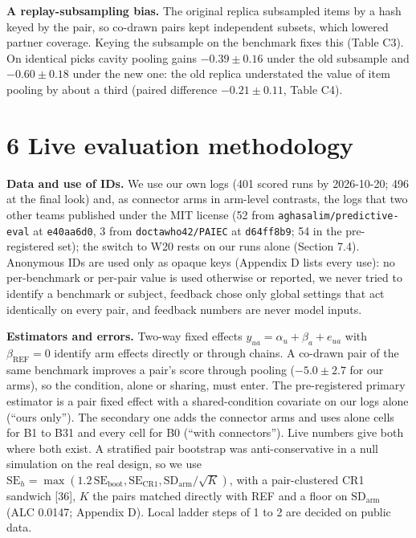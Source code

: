 \documentclass[
]{article}
\begin{document}
\textbf{A replay-subsampling bias.} The original replica subsampled
items by a hash keyed by the pair, so co-drawn pairs kept independent
subsets, which lowered partner coverage. Keying the subsample on the
benchmark fixes this (Table C3). On identical picks cavity pooling gains
\(-0.39 \pm 0.16\) under the old subsample and \(-0.60 \pm 0.18\) under
the new one: the old replica understated the value of item pooling by
about a third (paired difference \(-0.21 \pm 0.11\), Table C4).

\section{6 Live evaluation
methodology}\label{live-evaluation-methodology}

\textbf{Data and use of IDs.} We use our own logs (401 scored runs by
2026-10-20; 496 at the final look) and, as connector arms in arm-level
contrasts, the logs that two other teams published under the MIT license
(52 from \texttt{aghasalim/predictive-eval} at \texttt{e40aa6d0}, 3 from
\texttt{doctawho42/PAIEC} at \texttt{d64ff8b9}; 54 in the pre-registered
set); the switch to W20 rests on our runs alone (Section 7.4). Anonymous
IDs are used only as opaque keys (Appendix D lists every use): no
per-benchmark or per-pair value is used otherwise or reported, we never
tried to identify a benchmark or subject, feedback chose only global
settings that act identically on every pair, and feedback numbers are
never model inputs.

\textbf{Estimators and errors.} Two-way fixed effects
\(y_{ua} = \alpha_u + \beta_a + e_{ua}\) with
\(\beta_{\mathrm{REF}} = 0\) identify arm effects directly or through
chains. A co-drawn pair of the same benchmark improves a pair's score
through pooling (\(-5.0 \pm 2.7\) for our arms), so the condition, alone
or sharing, must enter. The pre-registered primary estimator is a pair
fixed effect with a shared-condition covariate on our logs alone (``ours
only''). The secondary one adds the connector arms and uses alone cells
for B1 to B31 and every cell for B0 (``with connectors''). Live numbers
give both where both exist. A stratified pair bootstrap was
anti-conservative in a null simulation on the real design, so we use
\(\mathrm{SE}_h = \max(1.2\,\mathrm{SE}_{\mathrm{boot}}, \mathrm{SE}_{\mathrm{CR1}},
\mathrm{SD}_{\mathrm{arm}}/\sqrt{K})\), with a pair-clustered CR1
sandwich {[}36{]}, \(K\) the pairs matched directly with REF and a floor
on \(\mathrm{SD}_{\mathrm{arm}}\) (ALC 0.0147; Appendix D). Local ladder
steps of 1 to 2 are decided on public data.
\end{document}
